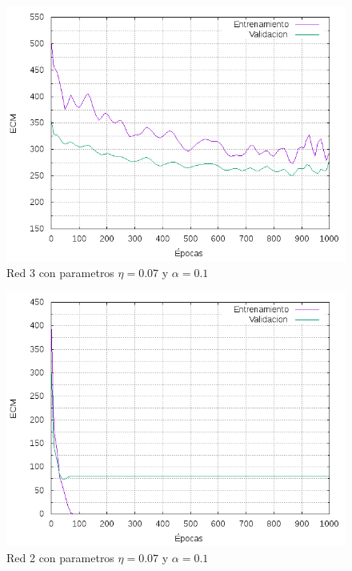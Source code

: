 \begin{figure}[h!]
  \includegraphics[width=125mm]{imagenes/ej1/ex_2-1_red_11-6-6-9-1_errors.png}
  \caption{Red 3 con parametros $\eta = 0.07$ y $  \alpha = 0.1$}
\end{figure}

\begin{figure}[h!]
  \includegraphics[width=125mm]{imagenes/ej1/ex_2-1_red_11-21-1_errors.png}
  \caption{Red 2 con parametros $\eta = 0.07$ y $  \alpha = 0.1$}
\end{figure}


